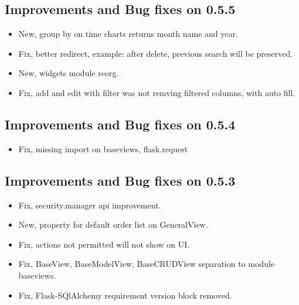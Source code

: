 \documentclass[letterpaper,10pt,english]{sphinxmanual}
\begin{document}
\subsection{Improvements and Bug fixes on 0.5.5}
\label{versions:improvements-and-bug-fixes-on-0-5-5}\begin{itemize}
\item {} 
New, group by on time charts returns month name and year.

\item {} 
Fix, better redirect, example: after delete, previous search will be preserved.

\item {} 
New, widgets module reorg.

\item {} 
Fix, add and edit with filter was not remving filtered columns, with auto fill.

\end{itemize}


\subsection{Improvements and Bug fixes on 0.5.4}
\label{versions:improvements-and-bug-fixes-on-0-5-4}\begin{itemize}
\item {} 
Fix, missing import on baseviews, flask.request

\end{itemize}


\subsection{Improvements and Bug fixes on 0.5.3}
\label{versions:improvements-and-bug-fixes-on-0-5-3}\begin{itemize}
\item {} 
Fix, security.manager api improvement.

\item {} 
New, property for default order list on GeneralView.

\item {} 
Fix, actions not permitted will not show on UI.

\item {} 
Fix, BaseView, BaseModelView, BaseCRUDView separation to module baseviews.

\item {} 
Fix, Flask-SQlAlchemy requirement version block removed.

\end{itemize}
\end{document}
